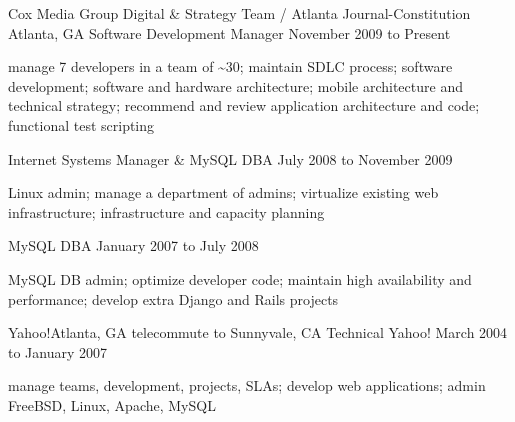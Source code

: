\documentclass[10pt]{article}
\begin{document}




\sectionheader
{Cox Media Group Digital \& Strategy Team / Atlanta Journal-Constitution}
{Atlanta, GA}
{Software Development Manager}
{November 2009 to Present}
\begin{longtext}
manage 7 developers in a team of \~{}30;
maintain SDLC process;
software development;
software and hardware architecture;
mobile architecture and technical strategy;
recommend and review application architecture and code;
functional test scripting

\end{longtext}
\sectionsub
{Internet Systems Manager \& MySQL DBA}
{July 2008 to November 2009}
\begin{longtext}
Linux admin;
manage a department of admins;
virtualize existing web infrastructure;
infrastructure and capacity planning
\end{longtext}
\sectionsub
{MySQL DBA}
{January 2007 to July 2008}
\begin{longtext}
MySQL DB admin;
optimize developer code;
maintain high availability and performance;
develop extra Django and Rails projects
\end{longtext}

\sectionheader
{Yahoo!}{Atlanta, GA telecommute to Sunnyvale, CA}
{Technical Yahoo!}
{March 2004 to January 2007}
\begin{longtext}
manage teams, development, projects, SLAs;
develop web applications;
admin FreeBSD, Linux, Apache, MySQL
\end{longtext}
\end{document}
